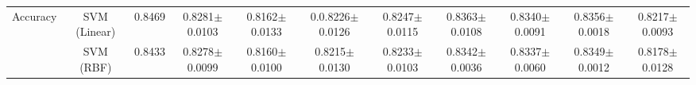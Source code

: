 \documentclass[sigconf]{acmart}
\theoremstyle{definition}
\begin{document}
\begin{table}[h]
{\begin{tabular}{|l|c|c|c|c|c|c|c|c|c|c|}
\multirow{3}{*}{Accuracy}                                                  & SVM (Linear)                & 0.8469    & 0.8281$\pm$0.0103                                              & 0.8162$\pm$0.0133                                                    & 0.0.8226$\pm$0.0126                                                    & 0.8247$\pm$0.0115                                                  & 0.8363$\pm$0.0108                                              & 0.8340$\pm$0.0091                                                    & 0.8356$\pm$0.0018                                                    & 0.8217$\pm$0.0093                                                  \\ \cline{2-11} 
                                                                           & SVM (RBF)                   & 0.8433    & 0.8278$\pm$0.0099                                             &  0.8160$\pm$0.0100   & 0.8215$\pm$0.0130                                                    & 0.8233$\pm$0.0103                                                 & 0.8342$\pm$0.0036                                               & 0.8337$\pm$0.0060                                                   & 0.8349$\pm$0.0012                                                    & 0.8178$\pm$0.0128                                                  \\ \cline{2-11} 

\end{tabular}}
\end{table}
\end{document}
